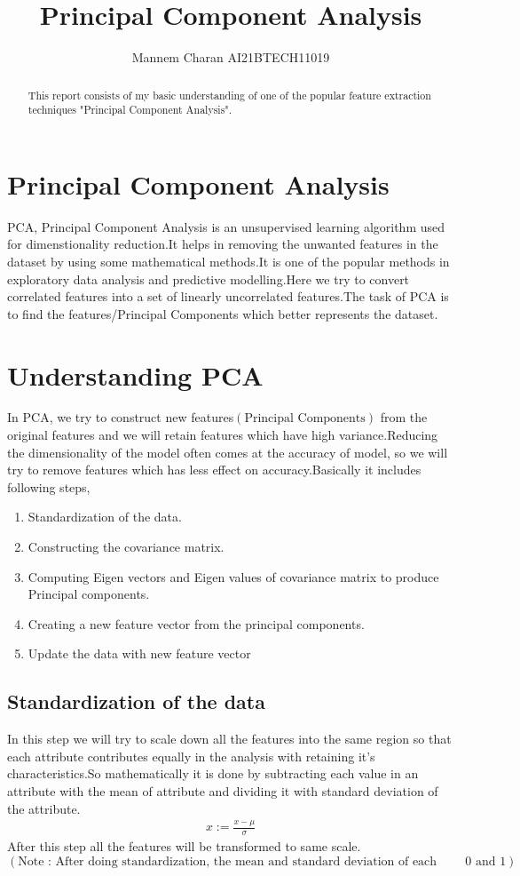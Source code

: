 \documentclass[journal,12pt,onecolumn]{IEEEtran}
\providecommand{\brak}[1]{\ensuremath{\left(#1\right)}}
\theoremstyle{remark}
\numberwithin{equation}{section}
\begin{document}
		\title{Principal Component Analysis}
		\author{ Mannem Charan AI21BTECH11019}
		 \maketitle
		\begin{abstract}
			This report consists of my basic understanding of one of the popular feature extraction techniques "Principal Component Analysis".
		\end{abstract}
                \section{Principal Component Analysis}
                  PCA, Principal Component Analysis is an unsupervised learning algorithm used for dimenstionality reduction.It helps in removing the unwanted features in the dataset by using some mathematical methods.It is one of the popular methods in exploratory data analysis and predictive modelling.Here we try to convert correlated features into a set of linearly uncorrelated features.The task of PCA is to find the features/Principal Components which better represents the dataset.
                \section{Understanding PCA}
                  In PCA, we try to construct new features\brak{\text{Principal Components}} from the original features and we will retain features which have high variance.Reducing the dimensionality of the model often comes at the accuracy of model, so we will try to remove features which has less effect on accuracy.Basically it includes following steps,
		  \begin{enumerate}
		   \item Standardization of the data.
		   \item Constructing the covariance matrix.
	           \item Computing Eigen vectors and Eigen values of covariance matrix to produce Principal components.
		   \item Creating a new feature vector from the principal components.
	           \item Update the data with new feature vector
		  \end{enumerate}
                \subsection{Standardization of the data}
		  In this step we will try to scale down all the features into the same region so that each attribute contributes equally in the analysis with retaining it's characteristics.So mathematically it is done by subtracting each value in an attribute with the mean of attribute and dividing it with standard deviation of the attribute. 
		  \begin{align}
			  x:=  \frac{x - \mu}{\sigma}
		  \end{align}
	       After this step all the features will be transformed to same scale.$\brak{\text{Note : After doing standardization, the mean and standard deviation of each feature will become $0$ and $1$}}$
\end{document}
